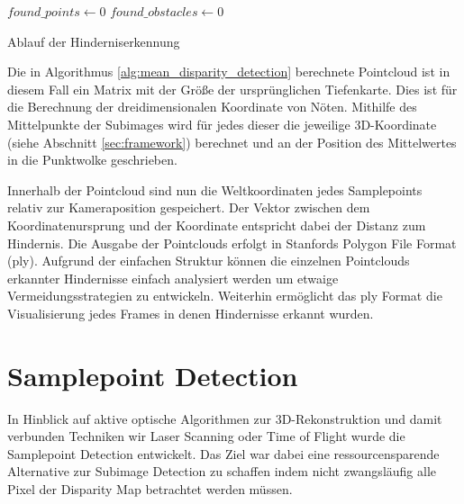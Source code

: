 %
\begin{algorithm}[h]
\begin{algorithmic}[1]
		\State $found\_points \gets 0$
		\State $found\_obstacles \gets 0$
			\EndIf
		\EndFor
		\EndIf 
    \EndProcedure
\end{algorithmic}
\caption{Ablauf der Hinderniserkennung}
\label{alg:mean_disparity_detection}
\end{algorithm}

\noindent
Die in Algorithmus \ref{alg:mean_disparity_detection} berechnete Pointcloud ist in diesem Fall ein Matrix mit der Größe der ursprünglichen Tiefenkarte. Dies ist für die Berechnung der dreidimensionalen Koordinate von Nöten. Mithilfe des Mittelpunkte der Subimages wird für jedes dieser die jeweilige 3D-Koordinate (siehe Abschnitt \ref{sec:framework}) berechnet und an der Position des Mittelwertes in die Punktwolke geschrieben.

\noindent
Innerhalb der Pointcloud sind nun die Weltkoordinaten jedes Samplepoints relativ zur Kameraposition gespeichert. Der Vektor zwischen dem Koordinatenursprung und der Koordinate entspricht dabei der Distanz zum Hindernis. Die Ausgabe der Pointclouds erfolgt in Stanfords Polygon File Format (ply). Aufgrund der einfachen Struktur können die einzelnen Pointclouds erkannter Hindernisse einfach analysiert werden um etwaige Vermeidungsstrategien zu entwickeln. Weiterhin ermöglicht das ply Format die Visualisierung jedes Frames in denen Hindernisse erkannt wurden.

\section{Samplepoint Detection}
\label{sec:samplepoint_detection}
In Hinblick auf aktive optische Algorithmen zur 3D-Rekonstruktion und damit verbunden Techniken wir Laser Scanning oder Time of Flight wurde die Samplepoint Detection entwickelt. Das Ziel war dabei eine ressourcensparende Alternative zur Subimage Detection zu schaffen indem nicht zwangsläufig alle Pixel der Disparity Map betrachtet werden müssen.\\

